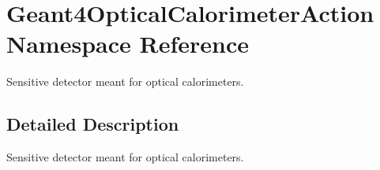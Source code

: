\hypertarget{namespace_geant4_optical_calorimeter_action}{
\section{Geant4OpticalCalorimeterAction Namespace Reference}
\label{namespace_geant4_optical_calorimeter_action}
}


Sensitive detector meant for optical calorimeters.  


\subsection{Detailed Description}
Sensitive detector meant for optical calorimeters. 
